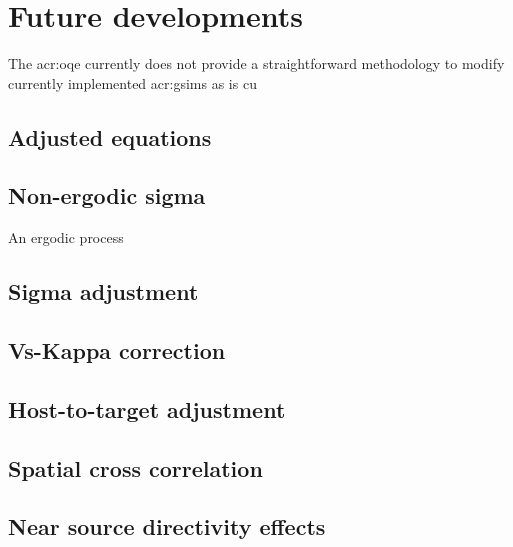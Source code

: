 \clearpage
%
\section{Future developments}
The \gls{acr:oqe} currently does not provide a straightforward methodology 
to modify currently implemented \glspl{acr:gsim} as is cu
%
\subsection{Adjusted equations}
%
\subsection{Non-ergodic sigma}
An ergodic process 
%
\subsection{Sigma adjustment}
%
\subsection{Vs-Kappa correction}
%
\subsection{Host-to-target adjustment}
%
\subsection{Spatial cross correlation}
%
\subsection{Near source directivity effects}

